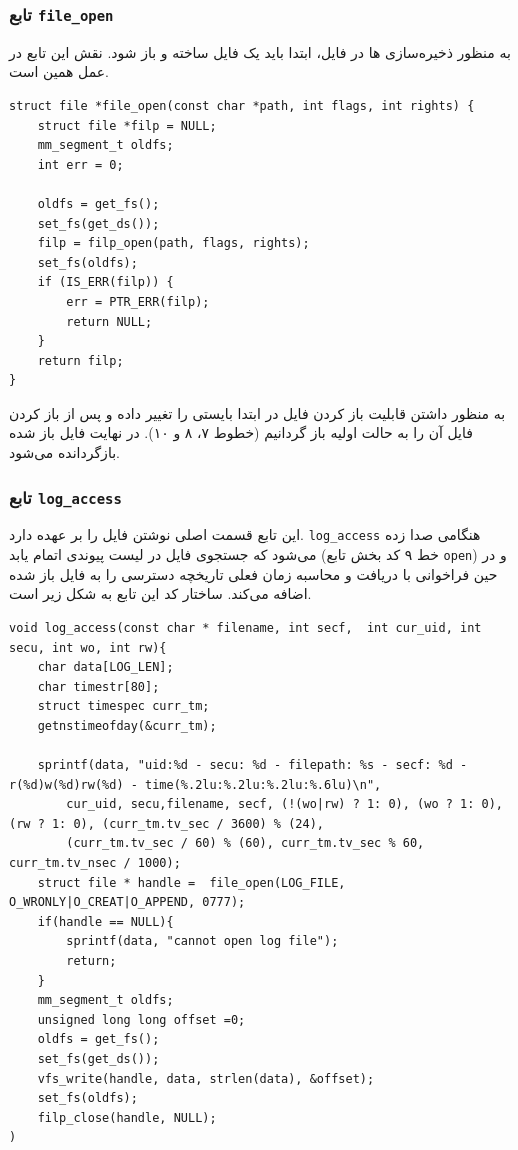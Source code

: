 \documentclass[13pt]{article}
\begin{document}
     \subsubsection{تابع \texttt{file\_open}}
     به منظور ذخیره‌سازی 
     ها در فایل، ابتدا باید یک فایل ساخته و باز شود. نقش این تابع در عمل همین است.
     \begin{latin}
     	\begin{lstlisting}
struct file *file_open(const char *path, int flags, int rights) {
	struct file *filp = NULL;
	mm_segment_t oldfs;
	int err = 0;
	
	oldfs = get_fs();
	set_fs(get_ds());
	filp = filp_open(path, flags, rights);
	set_fs(oldfs);
	if (IS_ERR(filp)) {
		err = PTR_ERR(filp);
		return NULL;
	}
	return filp;
} \end{lstlisting}
     \end{latin}
 \vspace{-2\baselineskip}
     به منظور داشتن قابلیت باز کردن فایل در ابتدا بایستی 
      را تغییر داده و پس از باز کردن فایل آن را به حالت اولیه باز گردانیم (خطوط ۷، ۸ و ۱۰). در نهایت فایل باز شده بازگردانده می‌شود.
      \subsubsection{تابع \texttt{log\_access}}
     این تابع قسمت اصلی نوشتن فایل را بر عهده دارد. 
     \texttt{log\_access}
     هنگامی صدا زده می‌شود که جستجوی فایل در لیست پیوندی اتمام یابد (خط ۹ کد بخش تابع \texttt{open}) و در حین فراخوانی با دریافت و محاسبه زمان فعلی تاریخچه دسترسی را به فایل باز شده اضافه می‌کند. ساختار کد این تابع به شکل زیر است.
\begin{latin}
	\begin{lstlisting}
void log_access(const char * filename, int secf,  int cur_uid, int secu, int wo, int rw){
	char data[LOG_LEN];
	char timestr[80];
	struct timespec curr_tm;
	getnstimeofday(&curr_tm);
	
	sprintf(data, "uid:%d - secu: %d - filepath: %s - secf: %d - r(%d)w(%d)rw(%d) - time(%.2lu:%.2lu:%.2lu:%.6lu)\n", 
		cur_uid, secu,filename, secf, (!(wo|rw) ? 1: 0), (wo ? 1: 0), (rw ? 1: 0), (curr_tm.tv_sec / 3600) % (24),
		(curr_tm.tv_sec / 60) % (60), curr_tm.tv_sec % 60, curr_tm.tv_nsec / 1000);
	struct file * handle =  file_open(LOG_FILE, O_WRONLY|O_CREAT|O_APPEND, 0777);
	if(handle == NULL){
		sprintf(data, "cannot open log file");
		return;
	}
	mm_segment_t oldfs;
	unsigned long long offset =0;
	oldfs = get_fs();
	set_fs(get_ds());
	vfs_write(handle, data, strlen(data), &offset);
	set_fs(oldfs);
	filp_close(handle, NULL);
)\end{lstlisting}
\end{latin}     
\vspace{-2\baselineskip}
\end{document}
